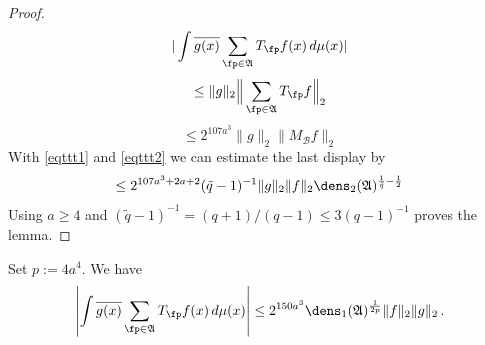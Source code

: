 \begin{proof}
 \begin{equation}
     |\int \overline{g(x)} \sum_{\fp \in \mathfrak{A}} T_{\fp} f(x)\, d\mu(x)|
\end{equation}
 \begin{equation}
     \le \|g\|_2 \Big\| \sum_{\fp \in \mathfrak{A}} T_{\fp} f \Big\|_2
\end{equation}
 \begin{equation}
     \le 2^{107a^3}\|g\|_2 \| M_{\mathcal{B}}f \|_2
\end{equation}
With \eqref{eqttt1} and
\eqref{eqttt2} we can estimate the last display by
\begin{equation}
    \le 2^{107a^3+2a+2}(\tilde{q}-1)^{-1} \|g\|_2 \|f\|_2\dens_2(\mathfrak{A})^{\frac 1{\tilde{q}}-\frac 12}
\end{equation}
Using $a\ge 4$ and
$(\tilde q - 1)^{-1} = (q+1)/(q-1) \le 3(q-1)^{-1}$
proves the lemma.
\end{proof}


\begin{lemma}\label{dens1-antichain}
Set $p:=4a^4$. We have
    \begin{equation}\label{eqttt3}
  \left|\int \overline{g(x)} \sum_{\fp \in \mathfrak{A}} T_{\fp} f(x)\, d\mu(x)\right|\le
   2^{150a^3}\dens_1(\mathfrak{A})^{\frac 1{2p}} \|f\|_2\|g\|_2\,.
\end{equation}
\end{lemma}



